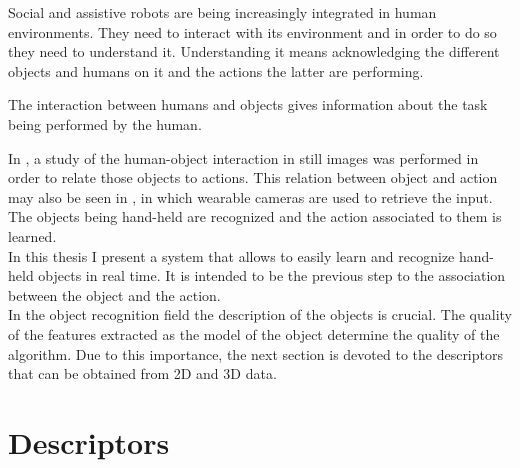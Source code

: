 
	Social and assistive robots are being increasingly integrated in human environments. 
	They need to interact with its environment and in order to do so they need to understand it. 
	Understanding it means acknowledging the different objects and humans on it and the actions the latter are performing. 

	The interaction between humans and objects gives information about the task being performed by the human. 

	In \cite{Delaitre}, a study of the human-object interaction in still images was performed in order to relate those objects to actions. 
	This relation between object and action may also be seen in \cite{Fathi}, in which wearable cameras are used to retrieve the input. 
	The objects being hand-held are recognized and the action associated to them is learned. 
	\\

	In this thesis I present a system that allows to easily learn and recognize hand-held objects in real time. 
	It is intended to be the previous step to the association between the object and the action. 
\\[1cm]

In the object recognition field the description of the objects is crucial. 
The quality of the features extracted as the model of the object determine the quality of the algorithm. 
Due to this importance, the next section is devoted to the descriptors that can be obtained from 2D and 3D data. 





\section{Descriptors}
\label{descriptors}

